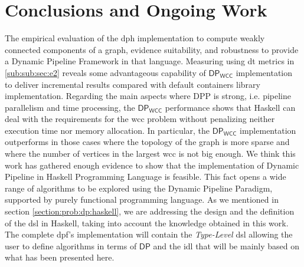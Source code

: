 \documentclass[preprint]{elsarticle}
\newcommand{\DP}{\mathsf{DP}}
\newcommand{\dpwcc}{\mathsf{DP_{WCC}}}
\begin{document}

\section{Conclusions and Ongoing Work}\label{conc}
The empirical evaluation of the \acrshort{dph} implementation to compute weakly connected components of a graph, evidence suitability, and robustness to provide a Dynamic Pipeline Framework in that language. Measuring  using \acrshort{dt} metrics in \autoref{sub:sub:sec:e2} reveals some advantageous capability of $\dpwcc$ implementation to deliver incremental results compared with default containers library implementation. Regarding the main aspects where DPP is strong, i.e. pipeline parallelism and time processing, the $\dpwcc$ performance shows that Haskell can deal with the requirements for the \acrshort{wcc} problem without penalizing neither execution time nor memory allocation. In particular, the $\dpwcc$ implementation outperforms in those cases where the topology of the graph is more sparse and where the number of vertices in the largest \acrshort{wcc} is not big enough. We think this work has gathered enough evidence to show that the implementation of Dynamic Pipeline in Haskell Programming Language is feasible. This fact opens a wide range of algorithms to be explored using the Dynamic Pipeline Paradigm, supported by purely functional programming language. As we mentioned in section \autoref{section:prob:dp:haskell}, we are addressing the design and the definition of the \acrshort{dsl} in Haskell, taking into account the knowledge obtained in this work. The complete \acrshort{dpf}'s implementation will contain the \textit{Type-Level} \acrshort{dsl} allowing the user to define algorithms in terms of $\DP$ and the \acrfull{idl} that will be mainly based on what has been presented here.
\end{document}
